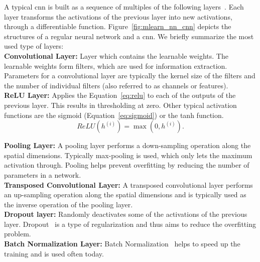 A typical \gls{cnn} is built as a sequence of multiples of the following layers~\cite{KarpathyStanfordRecognition}. Each layer transforms the activations of the previous layer into new activations, through a differentiable function. Figure~\ref{fig:mlearn_nn_cnn} depicts the structures of a regular neural network and a \gls{cnn}. We briefly summarize the most used type of layers:\\

\textbf{Convolutional Layer:} Layer which contains the learnable weights. The learnable weights form filters, which are used for information extraction. Parameters for a convolutional layer are typically the kernel size of the filters and the number of individual filters (also referred to as channels or features).\\

\textbf{ReLU Layer:} Applies the Equation~\ref{eq:relu} to each of the outputs of the previous layer. This results in thresholding at zero. Other typical activation functions are the sigmoid (Equation~\ref{eq:sigmoid}) or the tanh function.\\
\begin{equation}
   ReLU({h}^{(i)}) = \max(0, {h}^{(i)}).
   \label{eq:relu}
\end{equation}

\textbf{Pooling Layer:} A pooling layer performs a down-sampling operation along the spatial dimensions. Typically max-pooling is used, which only lets the maximum activation through. Pooling helps prevent overfitting by reducing the number of parameters in a network.\\

\textbf{Transposed Convolutional Layer:} A transposed convolutional layer performs an up-sampling operation along the spatial dimensions and is typically used as the inverse operation of the pooling layer.\\

\textbf{Dropout layer:} Randomly deactivates some of the activations of the previous layer. Dropout~\cite{Srivastava2014Dropout:Overfitting} is a type of regularization and thus aims to reduce the overfitting problem.\\

\textbf{Batch Normalization Layer:} Batch Normalization~\cite{SergeyIoffe2015BatchNormalization} helps to speed up the training and is used often today.
 
